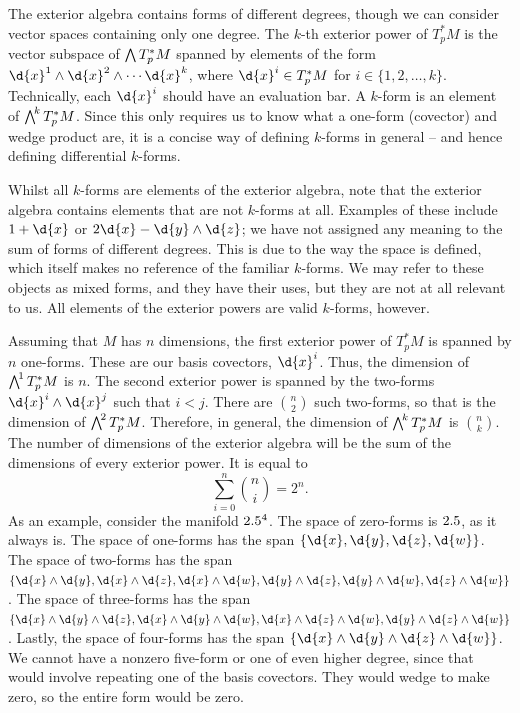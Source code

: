 \documentclass[a4paper,12pt]{article}
\begin{document}
The exterior algebra contains forms of different degrees, though we can consider vector spaces containing only one degree.
The $k$-th exterior power of $T^*_p M$ is the vector subspace of $\extp T^*_p M$ spanned by elements of the form $\d{x}^1 \wedge \d{x}^2 \wedge \cdots \d{x}^k$, where $\d{x}^i \in T^*_p M$ for $i \in \{1, 2, \ldots, k\}$.
Technically, each $\d{x}^i$ should have an evaluation bar.
A $k$-form is an element of $\extp^k T^*_p M$.
Since this only requires us to know what a one-form (covector) and wedge product are, it is a concise way of defining $k$-forms in general -- and hence defining differential $k$-forms.

Whilst all $k$-forms are elements of the exterior algebra, note that the exterior algebra contains elements that are not $k$-forms at all.
Examples of these include $1 + \d{x}$ or $2\d{x} - \d{y} \wedge \d{z}$; we have not assigned any meaning to the sum of forms of different degrees.
This is due to the way the space is defined, which itself makes no reference of the familiar $k$-forms.
We may refer to these objects as mixed forms, and they have their uses, but they are not at all relevant to us.
All elements of the exterior powers are valid $k$-forms, however.

Assuming that $M$ has $n$ dimensions, the first exterior power of $T^*_p M$ is spanned by $n$ one-forms.
These are our basis covectors, $\d{x}^i$.
Thus, the dimension of $\extp^1 T^*_p M$ is $n$.
The second exterior power is spanned by the two-forms $\d{x}^i \wedge \d{x}^j$ such that $i < j$.
There are $\binom{n}{2}$ such two-forms, so that is the dimension of $\extp^2 T^*_p M$.
Therefore, in general, the dimension of $\extp^k T^*_p M$ is $\binom{n}{k}$. 
The number of dimensions of the exterior algebra will be the sum of the dimensions of every exterior power.
It is equal to
\begin{equation*}
    \sum_{i=0}^{n} \binom{n}{i} = 2^n.
\end{equation*}
As an example, consider the manifold $2.5^4$.
The space of zero-forms is $2.5$, as it always is.
The space of one-forms has the span $\{\d{x}, \d{y}, \d{z}, \d{w}\}$.
The space of two-forms has the span $\{\d{x} \wedge \d{y}, \d{x} \wedge \d{z}, \d{x} \wedge \d{w}, \d{y} \wedge \d{z}, \d{y} \wedge \d{w}, \d{z} \wedge \d{w}\}$.
The space of three-forms has the span $\{\d{x} \wedge \d{y} \wedge \d{z}, \d{x} \wedge \d{y} \wedge \d{w}, \d{x} \wedge \d{z} \wedge \d{w}, \d{y} \wedge \d{z} \wedge \d{w}\}$.
Lastly, the space of four-forms has the span $\{\d{x} \wedge \d{y} \wedge \d{z} \wedge \d{w}\}$.
We cannot have a nonzero five-form or one of even higher degree, since that would involve repeating one of the basis covectors.
They would wedge to make zero, so the entire form would be zero.
\end{document}

